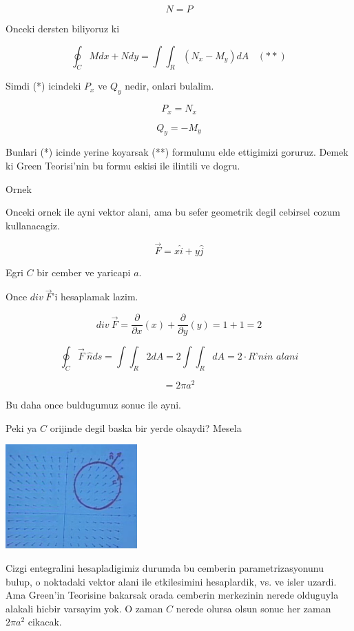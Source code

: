 \documentclass[12pt,fleqn]{article}
\begin{document}
\[ N = P \]

Onceki dersten biliyoruz ki 

\[ \oint_C Mdx + Ndy = \int \int_R (N_x - M_y) dA 
\ \ \ \ (**)
\]

Simdi (*) icindeki $P_x$ ve $Q_y$ nedir, onlari bulalim. 

\[ P_x = N_x \]

\[ Q_y = -M_y \]

Bunlari (*) icinde yerine koyarsak (**) formulunu elde ettigimizi
goruruz. Demek ki Green Teorisi'nin bu formu eskisi ile ilintili ve dogru. 

Ornek

Onceki ornek ile ayni vektor alani, ama bu sefer geometrik degil cebirsel
cozum kullanacagiz. 

\[ \vec{F} = x\hat{i} + y\hat{j} \]

Egri $C$ bir cember ve yaricapi $a$. 

Once $div \ \vec{F}$'i hesaplamak lazim. 

\[ div \ \vec{F}  = 
\frac{\partial }{\partial x}(x) + 
\frac{\partial }{\partial y}(y) = 
1 + 1 = 2 
 \]

\[ \oint_C \vec{F} \ \hat{n} ds = 
\int \int_R 2 dA = 
2 \int \int_R dA = 
2 \cdot \textit{R'nin alani}
 \]

\[ = 2\pi a^2 \]

Bu daha once buldugumuz sonuc ile ayni.

Peki ya $C$ orijinde degil baska bir yerde olsaydi? Mesela 

\includegraphics[height=4cm]{23_9.png}

Cizgi entegralini hesapladigimiz durumda bu cemberin parametrizasyonunu
bulup, o noktadaki vektor alani ile etkilesimini hesaplardik, vs. ve isler
uzardi. Ama Green'in Teorisine bakarsak orada cemberin merkezinin nerede
olduguyla alakali hicbir varsayim yok. O zaman $C$ nerede olursa olsun
sonuc her zaman $2\pi a^2$ cikacak. 
\end{document}
